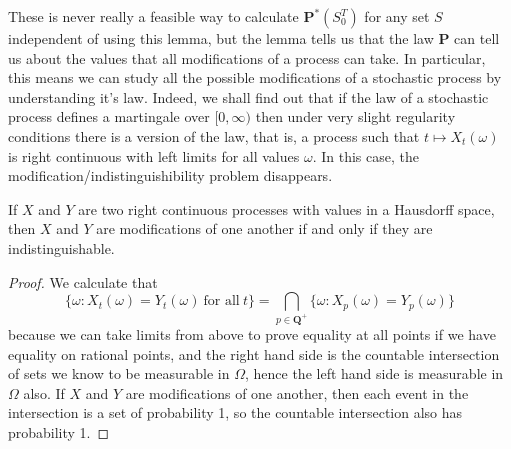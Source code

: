 These is never really a feasible way to calculate $\mathbf{P}^*(S_0^T)$ for any set $S$ independent of using this lemma, but the lemma tells us that the law $\mathbf{P}$ can tell us about the values that all modifications of a process can take. In particular, this means we can study all the possible modifications of a stochastic process by understanding it's law. Indeed, we shall find out that if the law of a stochastic process defines a martingale over $[0,\infty)$ then under very slight regularity conditions there is a {\bf \cadlag} version of the law, that is, a process such that $t \mapsto X_t(\omega)$ is right continuous with left limits for all values $\omega$. In this case, the modification/indistinguishibility problem disappears.

\begin{theorem}
    If $X$ and $Y$ are two right continuous processes with values in a Hausdorff space, then $X$ and $Y$ are modifications of one another if and only if they are indistinguishable.
\end{theorem}
\begin{proof}
    We calculate that
    \[ \{ \omega:  X_t(\omega) = Y_t(\omega)\ \text{for all}\ t \} = \bigcap_{p \in \mathbf{Q}^+} \{ \omega: X_p(\omega) = Y_p(\omega) \} \]
    because we can take limits from above to prove equality at all points if we have equality on rational points, and the right hand side is the countable intersection of sets we know to be measurable in $\Omega$, hence the left hand side is measurable in $\Omega$ also. If $X$ and $Y$ are modifications of one another, then each event in the intersection is a set of probability 1, so the countable intersection also has probability 1.
\end{proof}


